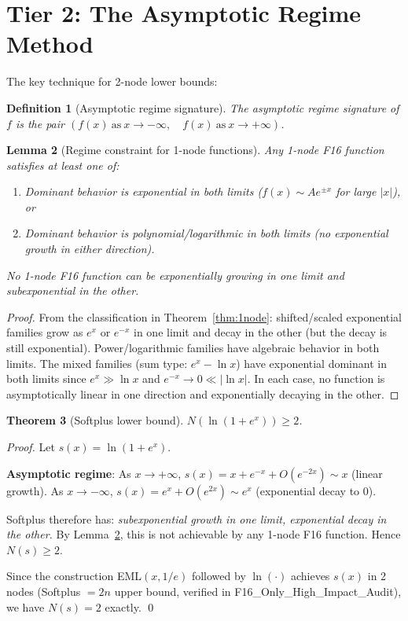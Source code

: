 \documentclass[11pt]{article}
\newtheorem{theorem}{Theorem}
\newtheorem{lemma}[theorem]{Lemma}
\newtheorem{definition}[theorem]{Definition}
\begin{document}
\section{Tier 2: The Asymptotic Regime Method}

The key technique for 2-node lower bounds:

\begin{definition}[Asymptotic regime signature]
The \emph{asymptotic regime signature} of $f$ is the pair
$(f(x)\ \text{as}\ x \to -\infty,\quad f(x)\ \text{as}\ x \to +\infty)$.
\end{definition}

\begin{lemma}[Regime constraint for 1-node functions]
\label{lem:regime}
Any 1-node F16 function satisfies at least one of:
\begin{enumerate}
  \item[(R1)] Dominant behavior is exponential in both limits
    ($f(x) \sim A e^{\pm x}$ for large $|x|$), or
  \item[(R2)] Dominant behavior is polynomial/logarithmic in both limits
    (no exponential growth in either direction).
\end{enumerate}
No 1-node F16 function can be \emph{exponentially growing in one limit and
subexponential in the other}.
\end{lemma}

\begin{proof}
From the classification in Theorem~\ref{thm:1node}: shifted/scaled exponential
families grow as $e^{x}$ or $e^{-x}$ in one limit and decay in the other
(but the decay is still exponential). Power/logarithmic families have algebraic
behavior in both limits. The mixed families (sum type: $e^x - \ln x$) have
exponential dominant in both limits since $e^x \gg \ln x$ and
$e^{-x} \to 0 \ll |\ln x|$. In each case, no function is asymptotically
linear in one direction and exponentially decaying in the other.
\end{proof}

\begin{theorem}[Softplus lower bound]
\label{thm:softplus}
$N(\ln(1+e^x)) \geq 2$.
\end{theorem}

\begin{proof}
Let $s(x) = \ln(1+e^x)$.

\textbf{Asymptotic regime}: As $x \to +\infty$, $s(x) = x + e^{-x} + O(e^{-2x}) \sim x$
(linear growth). As $x \to -\infty$, $s(x) = e^x + O(e^{2x}) \sim e^x$
(exponential decay to 0).

Softplus therefore has: \emph{subexponential growth in one limit, exponential
decay in the other.} By Lemma~\ref{lem:regime}, this is not achievable by any
1-node F16 function. Hence $N(s) \geq 2$.

Since the construction EML$(x, 1/e)$ followed by $\ln(\cdot)$ achieves $s(x)$ in 2 nodes
(Softplus $= 2n$ upper bound, verified in F16\_Only\_High\_Impact\_Audit),
we have $N(s) = 2$ exactly. \qed
\end{proof}
\end{document}
